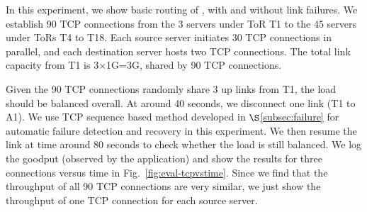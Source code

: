 %
%
%

 In this experiment, we show basic routing of \sys, with and without link failures. We establish $90$ TCP connections from the $3$ servers under ToR T1 to the $45$ servers under ToRs T4 to T18. Each source server initiates 30 TCP connections in parallel, and each destination server hosts two TCP connections. The total link capacity from T1 is 3$\times$1G=3G, shared by 90 TCP connections.

Given the 90 TCP connections randomly share 3 up links from T1, the load should be balanced overall. At around 40 seconds, we disconnect one link (T1 to A1). We use TCP sequence based method developed in $\S$\ref{subsec:failure} for automatic failure detection and recovery in this experiment. We then resume the link at time around 80 seconds to check whether the load is still balanced. We log the goodput (observed by the application) and show the results for three connections versus time in Fig.~\ref{fig:eval-tcpvstime}. Since we find that the throughput of all 90 TCP connections are very similar, we just show the throughput of one TCP connection for each source server.

